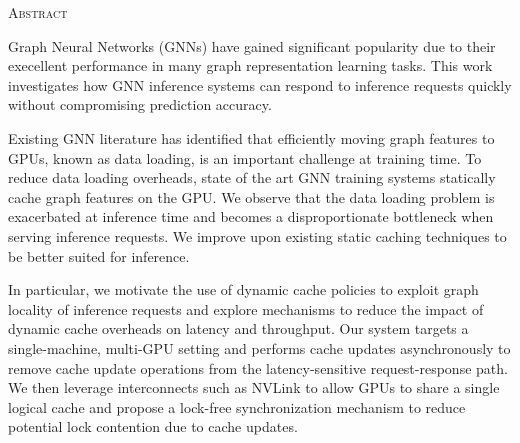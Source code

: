 \begin{center}
  \textsc{Abstract}
\end{center}
%
\noindent
%

Graph Neural Networks (GNNs) have gained significant popularity due to their execellent performance in many graph representation learning tasks. 
This work investigates how GNN inference systems can respond to inference requests quickly without compromising prediction accuracy.

Existing GNN literature has identified that efficiently moving graph features to GPUs, known as data loading, is an important challenge at training time. 
To reduce data loading overheads, state of the art GNN training systems statically cache graph features on the GPU.
We observe that the data loading problem is exacerbated at inference time and becomes a disproportionate bottleneck when serving inference requests. We improve upon existing static caching techniques to be better suited for inference. 

In particular, we motivate the use of dynamic cache policies to exploit graph locality of inference requests and explore mechanisms to reduce the impact of dynamic cache overheads on latency and throughput. 
Our system targets a single-machine, multi-GPU setting and performs cache updates asynchronously to remove cache update operations from the latency-sensitive request-response path.
We then leverage interconnects such as NVLink to allow GPUs to share a single logical cache and propose a lock-free synchronization mechanism to reduce potential lock contention due to cache updates. 